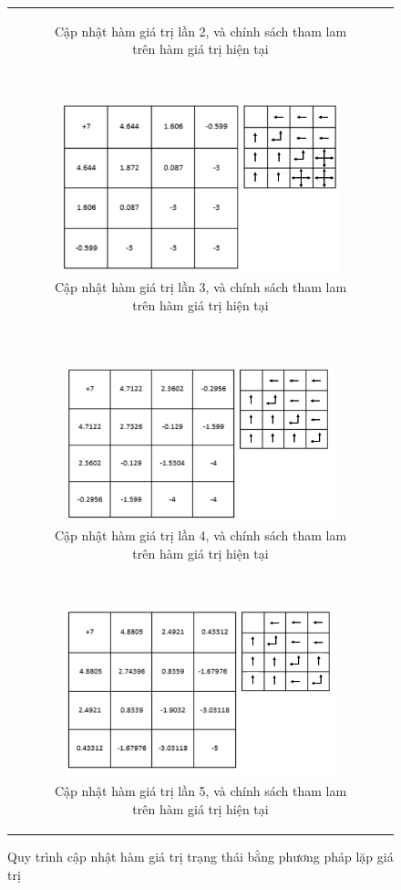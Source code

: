 \begin{figure}[t!]
\begin{tabular}{c}
\begin{subfigure}[t]{0.5\textwidth}
			\caption{Cập nhật hàm giá trị lần 2, và chính sách tham lam trên hàm giá trị hiện tại}
		\end{subfigure}%
		~ 
		\begin{subfigure}[t]{0.5\textwidth}
			\centering
			\includegraphics[height=50mm]{4}
			\caption{Cập nhật hàm giá trị lần 3, và chính sách tham lam trên hàm giá trị hiện tại}
		\end{subfigure} \\~\\
		\begin{subfigure}[t]{0.5\textwidth}
			\centering
			\includegraphics[height=45mm]{5}
			\caption{Cập nhật hàm giá trị lần 4, và chính sách tham lam trên hàm giá trị hiện tại}
		\end{subfigure}%
		~ 
		\begin{subfigure}[t]{0.5\textwidth}
			\centering
			\includegraphics[height=50mm]{6}
			\caption{Cập nhật hàm giá trị lần 5, và chính sách tham lam trên hàm giá trị hiện tại}
		\end{subfigure}
	\end{tabular}
	\caption[Minh họa quy trình lặp giá trị]{Quy trình cập nhật hàm giá trị trạng thái bằng phương pháp lặp giá trị}
	\label{fig:VI_process}
\end{figure}

